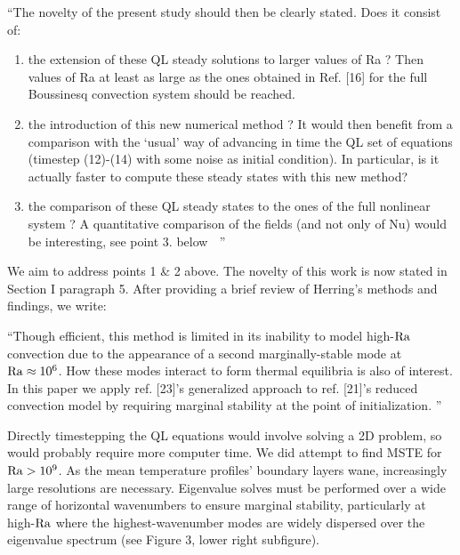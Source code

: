 \documentclass{article}
\begin{document}
\vspace{0.4cm}
\noindent
``The novelty of the present study should then be clearly stated. Does it consist of:
\begin{enumerate}
    \item the extension of these QL steady solutions to larger values of Ra ? Then values of Ra
          at least as large as the ones obtained in Ref. [16] for the full Boussinesq convection
          system should be reached.

    \item the introduction of this new numerical method ? It would then benefit from a comparison with the ‘usual’ way of advancing in time the QL set of equations (timestep (12)-(14) with some noise as initial condition). In particular, is it actually faster to compute these steady states with this new method?

    \item the comparison of these QL steady states to the ones of the full nonlinear system ? A quantitative comparison of the fields (and not only of Nu) would be interesting, see point 3. below $\;$ ''
\end{enumerate}

\vspace{0.4cm}

\noindent We aim to address points 1 \& 2 above.
The novelty of this work is now stated in Section I paragraph 5.
After providing a brief review of Herring's methods and findings, we write:

\vspace{0.4cm}
``Though efficient, this method is limited in its inability to model high-$\rm{Ra}$ convection due to the appearance of a second marginally-stable mode at $\rm{Ra} \approx 10^6$. How these modes interact to form thermal equilibria is also of interest.
In  this  paper  we  apply  ref.  [23]’s  generalized approach to ref. [21]’s reduced convection model by requiring  marginal  stability  at  the  point  of  initialization.  ''
\vspace{0.4cm}

Directly timestepping the QL equations would involve solving a 2D problem, so would probably require more computer time.
We did attempt to find MSTE for $\rm{Ra} > 10^9$.
As the mean temperature profiles' boundary layers wane, increasingly large resolutions are necessary.
Eigenvalue solves must be performed over a wide range of horizontal wavenumbers to ensure marginal stability, particularly at high-$\rm{Ra}$ where the highest-wavenumber modes are widely dispersed over the eigenvalue spectrum (see Figure 3, lower right subfigure).
\end{document}
